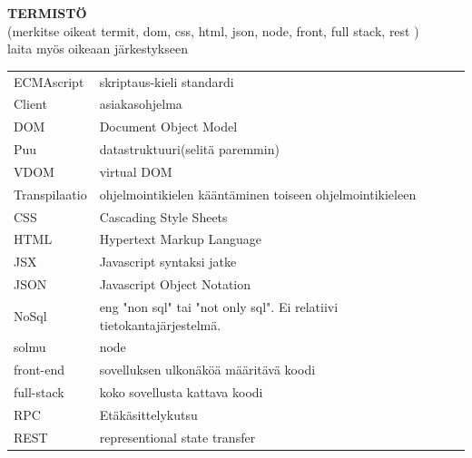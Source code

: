 \documentclass[11pt,a4paper,titlepage,oneside]{article}
\begin{document}
\textbf{ TERMISTÖ }\\
(merkitse oikeat termit, dom, css, html, json, node, front, full stack, rest )\\
laita myös oikeaan järkestykseen\\
\bigskip

\begin{tabular}{ p{3.7cm} b{12cm} }
ECMAscript\bigskip & skriptaus-kieli standardi \\ 
Client\bigskip & asiakasohjelma\\
DOM\bigskip & Document Object Model \\
Puu\bigskip & datastruktuuri(selitä paremmin)\\
VDOM\bigskip & virtual DOM\\
Transpilaatio\bigskip & ohjelmointikielen kääntäminen toiseen ohjelmointikieleen\\
CSS\bigskip & Cascading Style Sheets\\
HTML\bigskip & Hypertext Markup Language\\
JSX\bigskip & Javascript syntaksi jatke\\
JSON\bigskip & Javascript Object Notation\\
NoSql\bigskip & eng "non sql" tai "not only sql". Ei relatiivi tietokantajärjestelmä. \\
solmu\bigskip & node\\
front-end\bigskip & sovelluksen ulkonäköä määritävä koodi\\
full-stack\bigskip & koko sovellusta kattava koodi\\
RPC\bigskip & Etäkäsittelykutsu\\
REST\bigskip & representional state transfer\\
\end{tabular}




\newpage

\clearpage
\setcounter{page}{1}

\pagestyle{fancy}
\lfoot{}
\cfoot{}
\rfoot{}
\lhead{}
\chead{}
\rhead{\thepage}
\renewcommand{\headrulewidth}{0pt}
\renewcommand{\footrulewidth}{0pt}


\end{document}
